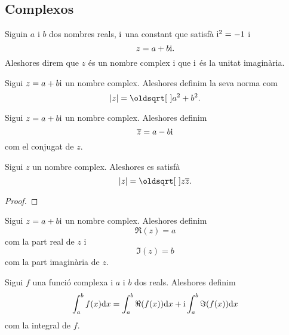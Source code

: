 \documentclass[../Apunts.tex]{subfiles}
\begin{document}
	\subsection{Complexos}
	\begin{definition}
		\label{def:nombre complex}
		\label{def:unitat imaginària}
		Siguin \(a\) i \(b\) dos nombres reals, \(\mathrm{i}\) una constant que satisfà \(\mathrm{i}^{2}=-1\) i
		\[z=a+b\mathrm{i}.\]
		Aleshores direm que \(z\) és un nombre complex i que \(\mathrm{i}\) és la unitat imaginària.
	\end{definition}
	\begin{definition}
		\label{def:norma d'un nombre complex}
		Sigui \(z=a+b\mathrm{i}\) un nombre complex. Aleshores definim la seva norma com
		\[\abs{z}=\sqrt{a^{2}+b^{2}}.\]
	\end{definition}
	\begin{definition}
		\label{def:nombre d'un nombre complex}
		Sigui \(z=a+b\mathrm{i}\) un nombre complex. Aleshores definim
		\[\overline{z}=a-b\mathrm{i}\]
		com el conjugat de \(z\).
	\end{definition}
	\begin{proposition}
		\label{prop:la nomra d'un nombre complex és l'arrel del nombre pel seu conjugat}
		Sigui \(z\) un nombre complex. Aleshores es satisfà
		\[\abs{z}=\sqrt{z\conjugat{z}}.\]
		\begin{proof}
		\end{proof}
	\end{proposition}
	\begin{definition}
		\label{def:part real i part imaginària d'un nombre complex}
		\label{def:part real d'un nombre complex}
		\label{def:part imaginària d'un nombre complex}
		Sigui \(z=a+b\mathrm{i}\) un nombre complex. Aleshores definim
		\[\Re(z)=a\]
		com la part real de \(z\) i
		\[\Im(z)=b\]
		com la part imaginària de \(z\).
	\end{definition}
	\begin{definition}
		\label{def:integral d'una funció complexa}
		Sigui \(f\) una funció complexa i \(a\) i \(b\) dos reals. Aleshores definim
		\[\int_{a}^{b}f(x)\mathrm{d} x=\int_{a}^{b}\Re(f(x))\mathrm{d} x+\mathrm{i}\int_{a}^{b}\Im(f(x))\mathrm{d} x\]
		com la integral de \(f\).
	\end{definition}
\end{document}
